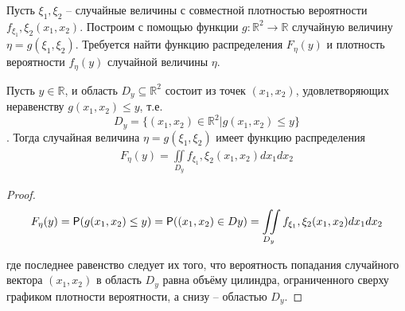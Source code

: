 \begin{zam}
\label{zam:16.1}
Пусть $\xi_1 , \xi_2$ -- случайные величины с совместной плотностью вероятности $f_{\xi_1} ,\xi_2 (x_1 , x_2 )$. Построим с помощью функции $g : \mathbb{R}^2 \to \mathbb{R}$ случайную величину $\eta = g(\xi_1 , \xi_2 )$. Требуется найти функцию распределения $F_\eta (y)$ и плотность вероятности $f_\eta (y)$ случайной величины $\eta$.
\end{zam}

\begin{lemma}
\label{lemma:16.2}

Пусть $y \in \mathbb{R}$, и область $D_y \subseteq \mathbb{R}^2$ состоит из точек $(x_1 , x_2 )$, удовлетворяющих неравенству $g(x_1 , x_2 ) \leq y$, т.е. $$D_y = \{(x_1 , x_2 ) \in \mathbb{R}^2 | g(x_1 , x_2 ) \leq y\}$$. Тогда случайная величина $\eta = g(\xi_1 , \xi_2 )$ имеет функцию распределения
\begin{gather*}
	F_\eta (y) = \iint\limits_{D_y}f_{\xi_1} ,\xi_2 (x_1 , x_2 ) dx_1 dx_2
\end{gather*}
\end{lemma}

\begin{proof}
\begin{gather*}
	F_\eta (y) = \P ( g(x_1 , x_2 ) \leq y ) = \P( (x_1 , x_2 ) \in Dy )= \iint\limits_{D_y}f_{\xi_1} ,\xi_2 (x_1 , x_2 ) dx_1 dx_2
\end{gather*}

где последнее равенство следует их того, что вероятность попадания случайного вектора $(x_1 , x_2 )$ в область $D_y$ равна объёму цилиндра, ограниченного сверху графиком плотности вероятности, а снизу -- областью $D_y$.
\end{proof}

